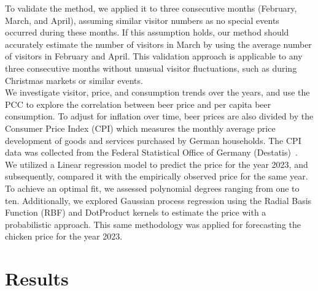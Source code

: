 \documentclass{article}
\theoremstyle{plain}
\theoremstyle{definition}
\theoremstyle{remark}
\begin{document}
To validate the method, we applied it to three consecutive months (February, March, and April), assuming similar visitor numbers as no special events occurred during these months. If this assumption holds, our method should accurately estimate the number of visitors in March by using the average number of visitors in February and April. This validation approach is applicable to any three consecutive months without unusual visitor fluctuations, such as during Christmas markets or similar events.\\
We investigate visitor, price, and consumption trends over the years, and use the PCC to explore the correlation between beer price and per capita beer consumption. To adjust for inflation over time, beer prices are also divided by the Consumer Price Index (CPI) which measures the monthly average price development of goods and services purchased by German households. The CPI data was collected from the Federal Statistical Office of Germany (Destatis)~\citep{10}.\\
We utilized a Linear regression model to predict the price for the year 2023, and subsequently, compared it with the empirically observed price for the same year. To achieve an optimal fit, we assessed polynomial degrees ranging from one to ten. Additionally, we explored Gaussian process regression using the Radial Basis Function (RBF) and DotProduct kernels to estimate the price with a probabilistic approach. This same methodology was applied for forecasting the chicken price for the year 2023.

%

\section{Results}\label{sec:results}
\end{document}

